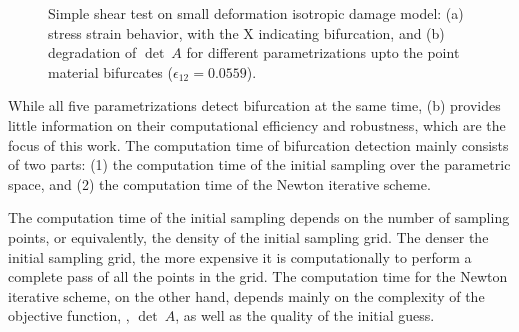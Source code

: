 \documentclass[12pt]{article}
\numberwithin{equation}{section}
\begin{document}
\begin{figure}[!htbp]
  \centering {} 
  \caption{Simple shear test on small deformation isotropic damage
    model: (a) stress strain behavior, with the X indicating
    bifurcation, and (b) degradation of $\det~A$ for different
    parametrizations upto the point material bifurcates
    ($\epsilon_{12}=0.0559$).}
  \label{fig:iso-stress_strain}
\end{figure}

While all five parametrizations detect bifurcation at the same time,
(b) provides little information on their
computational efficiency and robustness, which are the focus of this
work. The computation time of bifurcation detection mainly consists of
two parts: (1) the computation time of the initial sampling over the
parametric space, and (2) the computation time of the Newton iterative
scheme.

The computation time of the initial sampling depends on the number of
sampling points, or equivalently, the density of the initial sampling
grid. The denser the initial sampling grid, the more expensive it is
computationally to perform a complete pass of all the points in the
grid. The computation time for the Newton iterative scheme, on the
other hand, depends mainly on the complexity of the objective
function, \ie, $\det~A$, as well as the quality of the initial guess.
\end{document}
